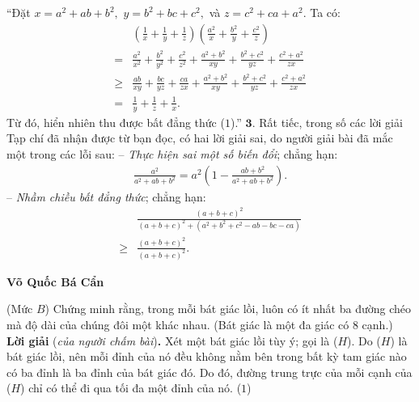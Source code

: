 \begin{multicols}{2}
	\vskip 0.05cm
	“Đặt $x = {a^2} + ab + {b^2},$ $y = {b^2} + bc + {c^2},$      và $z = {c^2} + ca + {a^2}$.  Ta có:
	\begin{align*}
			&\left( {\frac{1}{x} + \frac{1}{y} + \frac{1}{z}} \right)\left( {\frac{{{a^2}}}{x} + \frac{{{b^2}}}{y} + \frac{{{c^2}}}{z}} \right)\\
			= &\frac{{{a^2}}}{{{x^2}}} \!+\! \frac{{{b^2}}}{{{y^2}}} \!+\! \frac{{{c^2}}}{{{z^2}}} \!+\! \frac{{{a^2} \!+\! {b^2}}}{{xy}} \!+\! \frac{{{b^2} \!+\! {c^2}}}{{yz}} \!+\! \frac{{{c^2} \!+\! {a^2}}}{{zx}}\\
			\ge &\frac{{ab}}{{xy}} \!+\! \frac{{bc}}{{yz}} \!+\! \frac{{ca}}{{zx}} \!+\! \frac{{{a^2} \!+\! {b^2}}}{{xy}} \!+\! \frac{{{b^2} \!+\! {c^2}}}{{yz}} \!+\! \frac{{{c^2}\! +\! {a^2}}}{{zx}}\\
			= &\frac{1}{y} + \frac{1}{z} + \frac{1}{x}.
	\end{align*}
	Từ đó, hiển nhiên thu được bất đẳng thức ($1$).”
	\vskip 0.05cm
	$\pmb{3.}$ Rất tiếc, trong số các lời giải Tạp chí đã nhận được từ bạn đọc, có hai lời giải sai, do người giải bài đã mắc một trong các lỗi sau:
	\vskip 0.05cm
	-- \textit{Thực hiện sai một số biến đổi}; chẳng hạn:
	\begin{align*}
		\frac{{{a^2}}}{{{a^2} + ab + {b^2}}} = {a^2}\left( {1 - \frac{{ab + {b^2}}}{{{a^2} + ab + {b^2}}}} \right).
	\end{align*}
	-- \textit{Nhầm chiều bất đẳng thức}; chẳng hạn:
	\begin{align*}
		&\frac{{{{\left( {a + b + c} \right)}^2}}}{{{{\left( {a \!+\! b \!+\! c} \right)}^2} \!+\! \left( {{a^2} \!+\! {b^2} \!+\! {c^2} \!-\! ab \!-\! bc \!-\! ca} \right)}} \\
		\ge &\frac{{{{\left( {a + b + c} \right)}^2}}}{{{{\left( {a + b + c} \right)}^2}}}.
	\end{align*}
	\begin{flushright}
		\textbf{\color{thachthuctoanhoc}Võ Quốc Bá Cẩn}
	\end{flushright}
	{}
	(Mức $B$)
	Chứng minh rằng, trong mỗi bát giác lồi, luôn có ít nhất ba đường chéo mà độ dài của chúng đôi một khác nhau.
	(Bát giác là một đa giác có $8$ cạnh.)
	\vskip 0.05cm
	\textbf{\color{thachthuctoanhoc}Lời giải} (\textit{của người chấm bài})\textbf{\color{thachthuctoanhoc}.}
	\vskip 0.05cm
	Xét một bát giác lồi tùy ý; gọi là ($H$).
	\vskip 0.05cm
	Do ($H$) là bát giác lồi, nên mỗi đỉnh của nó đều không nằm bên trong bất kỳ tam giác nào có ba đỉnh là ba đỉnh của bát giác đó. Do đó, đường trung trực của mỗi cạnh của ($H$) chỉ có thể đi qua tối đa một đỉnh của nó. \hfill ($1$)

\end{multicols}
